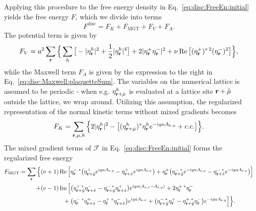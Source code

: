Applying this procedure to the free energy density in Eq.~\eqref{eq:disc:FreeEn:initial} yields the free energy $F$, which we divide into terms
\begin{equation}
  F^\text{disc} = F_K + F_\text{MGT} + F_V + F_A.
  \label{eq:disc:FreeEn:disc}
\end{equation}
The potential term is given by
\begin{equation}
  F_V = a^2\sum_{\boldsymbol{\mathbf{r}}}\Big\{\sum_h\big[-|\eta^h_{\boldsymbol{\mathbf{r}}}|^2 + \frac{1}{2}|\eta^h_{\boldsymbol{\mathbf{r}}}|^4\big] + 2|\eta^+_{\boldsymbol{\mathbf{r}}}\eta^-_{\boldsymbol{\mathbf{r}}}|^2 + \nu\operatorname{Re}\big[(\eta^+_{\boldsymbol{\mathbf{r}}})^{\ast\,2}(\eta_{\boldsymbol{\mathbf{r}}}^-)^2\big]\Big\},
  \label{eq:disc:FreeEn:disc:potential}
\end{equation}
while the Maxwell term $F_A$ is given by the expression to the right in Eq.~\eqref{eq:disc:Maxwell:plaquetteSum}. The variables on the numerical lattice is assumed to be periodic - 
when e.g. $\eta_{{\boldsymbol{\mathbf{r}}}+\hat{\mu}}^h$ is evaluated at a lattice site ${\boldsymbol{\mathbf{r}}} + \hat{\mu}$ outside the lattice, we wrap around. Utilizing this assumption, the regularized representation of the normal
kinetic terms without mixed gradients becomes
\begin{equation}
  F_K = \sum_{{\boldsymbol{\mathbf{r}}},\mu,h}\Big\{2|\eta^h_{\boldsymbol{\mathbf{r}}}|^2 - \big[(\eta^h_{{\boldsymbol{\mathbf{r}}}+\hat{\mu}})^\ast\eta^h_{\boldsymbol{\mathbf{r}}}e^{-igaA_{{\boldsymbol{\mathbf{r}}},\mu}} + \text{c.c.}\big]\Big\}.
  \label{eq:disc:FreeEn:disc:kin}
\end{equation}
The mixed gradient terms of $\mathcal{F}$ in Eq.~\eqref{eq:disc:FreeEn:initial} forms the regularized free energy
\begin{equation}
  \begin{split}
	F_\text{MGT} = \sum_{\boldsymbol{\mathbf{r}}}\Big\{&(\nu+1)\operatorname{Re}\Big[\eta^{-\;\ast}_{\boldsymbol{\mathbf{r}}}\big(\eta^+_{{\boldsymbol{\mathbf{r}}}+\hat{y}}e^{igaA_{{\boldsymbol{\mathbf{r}}},y}}-\eta^+_{{\boldsymbol{\mathbf{r}}}+\hat{x}}e^{igaA_{{\boldsymbol{\mathbf{r}}},x}}\big)
	+ \eta^+_{\boldsymbol{\mathbf{r}}}\big(\eta^{-\;\ast}_{{\boldsymbol{\mathbf{r}}}+\hat{y}}e^{-igaA_{{\boldsymbol{\mathbf{r}}},y}} - \eta^{-\;\ast}_{{\boldsymbol{\mathbf{r}}}+\hat{x}}e^{-igaA_{{\boldsymbol{\mathbf{r}}},x}}\big)\Big]\\
	+&(\nu-1)\operatorname{Im}\Big[\big(\eta^{+\;\ast}_{{\boldsymbol{\mathbf{r}}}+\hat{y}}\eta^-_{{\boldsymbol{\mathbf{r}}}+\hat{x}} - \eta^{-\;\ast}_{{\boldsymbol{\mathbf{r}}}+\hat{y}}\eta^+_{{\boldsymbol{\mathbf{r}}}+\hat{x}}\big)e^{iga(A_{{\boldsymbol{\mathbf{r}}},x}-A_{{\boldsymbol{\mathbf{r}}},y})} + 2\eta^{+\;\ast}_{\boldsymbol{\mathbf{r}}}\eta^-_{\boldsymbol{\mathbf{r}}}\\
	  &\qquad\quad\;\;\;+\big(\eta^{-\;\ast}_{\boldsymbol{\mathbf{r}}}\eta^+_{{\boldsymbol{\mathbf{r}}}+\hat{x}} - \eta^{+\;\ast}_{\boldsymbol{\mathbf{r}}}\eta^-_{{\boldsymbol{\mathbf{r}}}+\hat{x}}\big)e^{igaA_{{\boldsymbol{\mathbf{r}}},x}}
	+ \big(\eta^{-\;\ast}_{{\boldsymbol{\mathbf{r}}}+\hat{y}}\eta^+_{\boldsymbol{\mathbf{r}}} - \eta^{+\;\ast}_{{\boldsymbol{\mathbf{r}}}+\hat{y}}\eta^-_{\boldsymbol{\mathbf{r}}}\big)e^{-igaA_{{\boldsymbol{\mathbf{r}}},y}}\Big]\Big\}.
  \end{split}
  \label{eq:disc:FreeEn:disc:MGT}
\end{equation}

